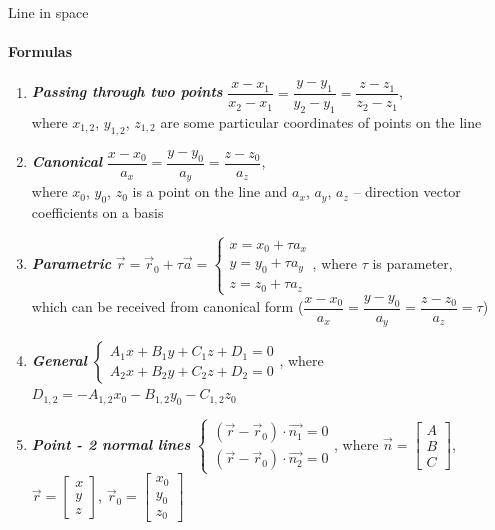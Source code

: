 \documentclass[aspectratio=169]{beamer}
\begin{document}
\begin{frame}[t]{Line in space}
    \framesubtitle{Formulas}
    \scriptsize
    \vspace{-0.4cm}
    \begin{multicols}{2}
        \begin{enumerate}
            \item \textbf{\textit{Passing through two points}} $\dfrac{x-x_1}{x_2-x_1} = \dfrac{y-y_1}{y_2-y_1}=\dfrac{z-z_1}{z_2-z_1}$, \smallskip\\ where $x_{1,2}$, $y_{1,2}$, $z_{1,2}$ are some particular coordinates of points on the line
            \item \textbf{\textit{Canonical}} $\dfrac{x-x_0}{a_x} = \dfrac{y-y_0}{a_y}=\dfrac{z-z_0}{a_z}$, \smallskip\\ where $x_0$, $y_0$, $z_0$ is a point on the line and $a_x$, $a_y$, $a_z$ -- direction vector coefficients on a basis
            \item \textbf{\textit{Parametric}} $\vec{r} = \vec{r}_0 + \tau \vec{a}=\left\{\begin{matrix} x = x_0 + \tau a_x
                          \\ y = y_0 + \tau a_y \\ z = z_0 + \tau a_z
                      \end{matrix}\right.$, where $\tau$ is parameter,\\ which can be received from canonical form ($\dfrac{x-x_0}{a_x} = \dfrac{y-y_0}{a_y} =\dfrac{z-z_0}{a_z}= \tau$)
            \item \textbf{\textit{General}} $\left\{\begin{matrix} A_1x + B_1y + C_1z + D_1 = 0
                          \\ A_2x + B_2y + C_2z + D_2 = 0
                      \end{matrix}\right.$, where \smallskip \\ $D_{1,2} = -A_{1,2}x_0 - B_{1,2}y_0 - C_{1,2}z_0$
            \item \textbf{\textit{Point - 2 normal lines}} $\left\{\begin{matrix}(\vec{r} - \vec{r}_0) \cdot \vec{n_1} = 0 \\ (\vec{r} - \vec{r}_0) \cdot \vec{n_2} = 0 \end{matrix}\right.$, where $\vec{n} = \begin{bmatrix}A\\B\\C \end{bmatrix}$, $\vec{r} = \begin{bmatrix}x\\y\\z \end{bmatrix}$, $\vec{r}_0 = \begin{bmatrix}x_0\\y_0\\z_0 \end{bmatrix}$

\end{enumerate}
\end{multicols}
\end{frame}
\end{document}
